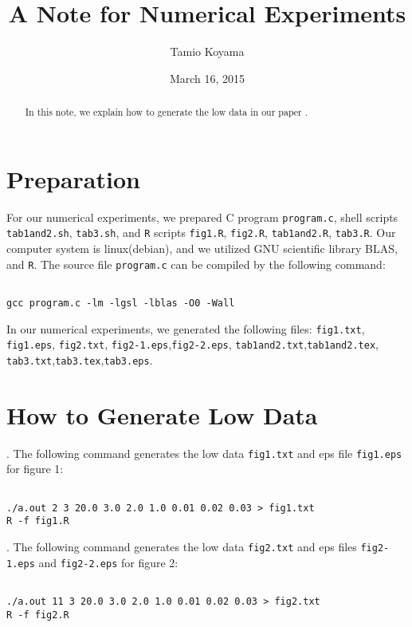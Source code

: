 \documentclass{article}
\title{A Note for Numerical Experiments}
\author{Tamio Koyama}
\date{March 16, 2015}
\begin{document}
\maketitle

\begin{abstract}
In this note, we explain how to generate the low data in our paper
\cite{koyama-takemura2}.
\end{abstract}

\section{Preparation}
For our numerical experiments, we prepared C program {\tt program.c}, 
shell scripts {\tt tab1and2.sh}, {\tt tab3.sh},
and {\tt R} scripts {\tt fig1.R}, {\tt fig2.R}, {\tt tab1and2.R}, {\tt tab3.R}.
Our computer system is linux(debian), and we utilized GNU scientific library
BLAS, and {\tt R}.
The source file {\tt program.c} can be compiled by the following command:
\begin{lstlisting}[style=BashInputStyle]

gcc program.c -lm -lgsl -lblas -O0 -Wall 
\end{lstlisting}

 
In our numerical experiments, we generated the following files:
{\tt fig1.txt}, {\tt fig1.eps},
{\tt fig2.txt}, {\tt fig2-1.eps},{\tt fig2-2.eps},
{\tt tab1and2.txt},{\tt tab1and2.tex},
{\tt tab3.txt},{\tt tab3.tex},{\tt tab3.eps}.

\section{How to Generate Low Data}
\/.
The following command generates the low data {\tt fig1.txt}
and eps file {\tt fig1.eps} for figure 1:
\begin{lstlisting}[style=BashInputStyle]

./a.out 2 3 20.0 3.0 2.0 1.0 0.01 0.02 0.03 > fig1.txt
R -f fig1.R
\end{lstlisting}

\medskip{}\/.
The following command generates the low data {\tt fig2.txt}
and eps files {\tt fig2-1.eps} and {\tt fig2-2.eps} for figure 2:
\begin{lstlisting}[style=BashInputStyle]

./a.out 11 3 20.0 3.0 2.0 1.0 0.01 0.02 0.03 > fig2.txt
R -f fig2.R
\end{lstlisting}
\end{document}
